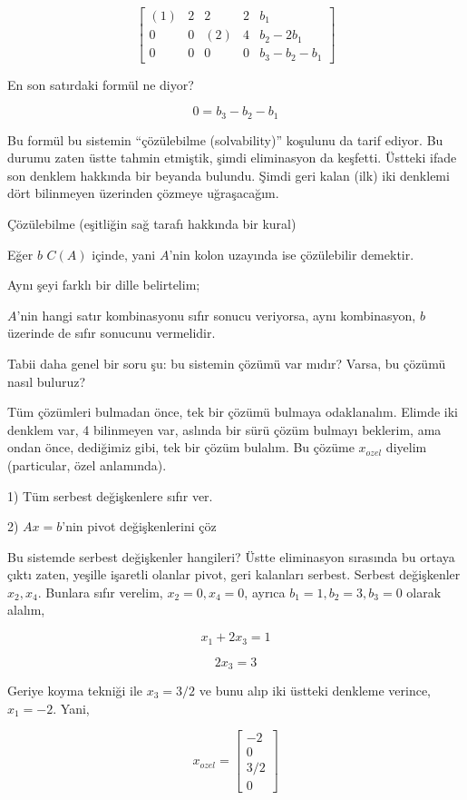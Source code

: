 \documentclass[12pt,fleqn]{article}\usepackage{../../common}
\begin{document}
$$ 
\left[\begin{array}{llll|l}
(1) & 2 & 2 & 2 & b_1 \\
0 & 0 & (2) & 4 & b_2-2b_1 \\
0 & 0 & 0 & 0 & b_3-b_2-b_1
\end{array}\right]
 $$

En son satırdaki formül ne diyor? 

$$ 0 = b_3 - b_2 - b_1 $$

Bu formül bu sistemin ``çözülebilme (solvability)'' koşulunu da tarif
ediyor. Bu durumu zaten üstte tahmin etmiştik, şimdi eliminasyon da
keşfetti. Üstteki ifade son denklem hakkında bir beyanda bulundu. Şimdi
geri kalan (ilk) iki denklemi dört bilinmeyen üzerinden çözmeye
uğraşacağım.

Çözülebilme (eşitliğin sağ tarafı hakkında bir kural)

Eğer $b$ $C(A)$ içinde, yani $A$'nin kolon uzayında ise çözülebilir
demektir. 

Aynı şeyi farklı bir dille belirtelim;

$A$'nin hangi satır kombinasyonu sıfır sonucu veriyorsa, aynı kombinasyon,
$b$ üzerinde de sıfır sonucunu vermelidir. 

Tabii daha genel bir soru şu: bu sistemin çözümü var mıdır? Varsa, bu
çözümü nasıl buluruz? 

Tüm çözümleri bulmadan önce, tek bir çözümü bulmaya odaklanalım. Elimde iki
denklem var, 4 bilinmeyen var, aslında bir sürü çözüm bulmayı beklerim, ama
ondan önce, dediğimiz gibi, tek bir çözüm bulalım. Bu çözüme $x_{ozel}$
diyelim (particular, özel anlamında). 

1) Tüm serbest değişkenlere sıfır ver. 

2) $Ax=b$'nin pivot değişkenlerini çöz

Bu sistemde serbest değişkenler hangileri? Üstte eliminasyon sırasında bu
ortaya çıktı zaten, yeşille işaretli olanlar pivot, geri kalanları
serbest. Serbest değişkenler $x_2,x_4$. Bunlara sıfır verelim,
$x_2=0,x_4=0$, ayrıca $b_1=1,b_2=3,b_3=0$ olarak alalım,

$$ x_1 + 2x_3 = 1 $$

$$ 2x_3 = 3 $$

Geriye koyma tekniği ile $x_3 = 3/2$ ve bunu alıp iki üstteki denkleme
verince, $x_1 = -2$. Yani,

$$ x_{ozel} = \left[\begin{array}{c}
-2 \\ 0 \\ 3/2 \\ 0
\end{array}\right] $$
\end{document}
